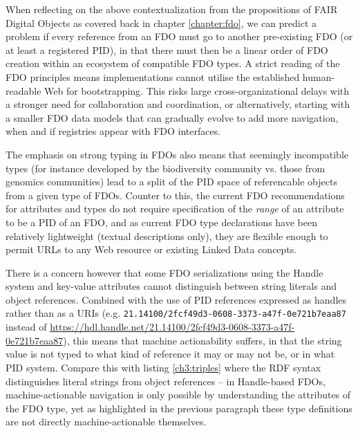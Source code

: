 When reflecting on the above contextualization from the propositions of FAIR Digital Objects as covered back in chapter \ref{chapter:fdo}, we can predict a problem if every reference from an FDO must go to another pre-existing FDO (or at least a registered PID), in that there must then be a linear order of FDO creation within an ecosystem of compatible FDO types.
A strict reading of the FDO principles means implementations cannot utilise the established human-readable Web for bootstrapping.
This risks large cross-organizational delays with a stronger need for collaboration and coordination, or alternatively, starting with a smaller FDO data models that can gradually evolve to add more navigation, when and if registries appear with FDO interfaces. 

The emphasis on strong typing in FDOs also means that seemingly incompatible types (for instance developed by the biodiversity community vs. those from genomics communities) lead to a split of the PID space of referencable objects from a given type of FDOs.  Counter to this, the current FDO recommendations for attributes and types \cite{fdo-ImplAttributesTypesProfiles} do not require specification of the \emph{range} of an attribute to be a PID of an FDO, and as current FDO type declarations have been relatively lightweight (textual descriptions only), they are flexible enough to permit URLs to any Web resource or existing Linked Data concepts.  

There is a concern however that some FDO serializations using the Handle system and key-value attributes cannot distinguish between string literals and object references.
Combined with the use of PID references expressed as handles rather than as a URIs (e.g. \texttt{21.14100/2fcf49d3-0608-3373-a47f-0e721b7eaa87} instead of \url{https://hdl.handle.net/21.14100/2fcf49d3-0608-3373-a47f-0e721b7eaa87}), this means that machine actionability suffers, in that the string value is not typed to what kind of reference it may or may not be, or in what PID system. Compare this with listing \vref{ch3:triples} where the RDF syntax distinguishes literal strings from object references -- in Handle-based FDOs, machine-actionable navigation is only possible by understanding the attributes of the FDO type, yet as highlighted in the previous paragraph these type definitions are not directly machine-actionable themselves.

